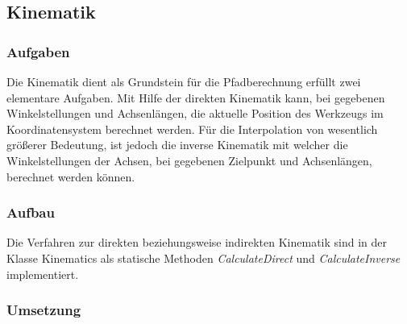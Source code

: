 
\subsection{Kinematik}

\subsubsection{Aufgaben}
Die Kinematik dient als Grundstein für die Pfadberechnung erfüllt zwei elementare Aufgaben. Mit Hilfe der direkten Kinematik kann, bei gegebenen Winkelstellungen und Achsenlängen, die aktuelle Position des Werkzeugs im Koordinatensystem berechnet werden. Für die Interpolation von wesentlich größerer Bedeutung, ist jedoch die inverse Kinematik mit welcher die Winkelstellungen der Achsen, bei gegebenen Zielpunkt und Achsenlängen, berechnet werden können.

\subsubsection{Aufbau}
Die Verfahren zur direkten beziehungsweise indirekten Kinematik sind in der Klasse Kinematics als statische Methoden \textit{CalculateDirect} und \textit{CalculateInverse} implementiert.

\subsubsection{Umsetzung}

